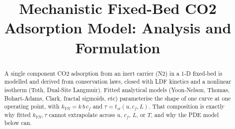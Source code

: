 \documentclass[a4paper]{amsart}
\theoremstyle{definition}
\begin{document}
\title{Mechanistic Fixed-Bed CO2 Adsorption Model: Analysis and Formulation}
\date{}
\maketitle

\makeatletter
\def\subsubsection{\@startsection{subsubsection}{3}%
  \z@{.5\linespacing\@plus.7\linespacing}{.1\linespacing}%
  {\normalfont\itshape}}
\makeatother

\begin{abstract}
A single component CO2 adsorption from an inert carrier (N2) in a 1-D fixed-bed is modelled and derived from conservation laws, closed with LDF kinetics and a nonlinear isotherm (Toth, Dual-Site Langmuir). Fitted analytical models (Yoon-Nelson, Thomas, Bohart-Adams, Clark, fractal sigmoids, etc) parameterise the shape of one curve at one operating point, with $k_{YN}=k\,b\,c_f$ and $\tau=t_{st}(u,c_f,L)$. That composition is exactly why fitted $k_{YN},\tau$ cannot extrapolate across $u$, $c_f$, $L$, or $T$, and why the PDE model below can.
\end{abstract}
\end{document}
